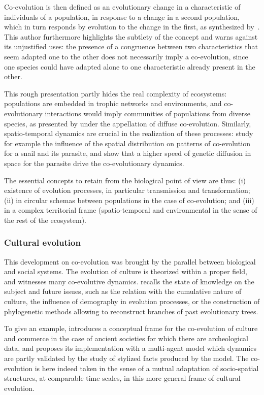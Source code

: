 \documentclass[letterpaper]{article}
\begin{document}
Co-evolution is then defined as an evolutionary change in a characteristic of individuals of a population, in response to a change in a second population, which in turn responds by evolution to the change in the first, as synthesized by~\cite{janzen1980coevolution}. This author furthermore highlights the subtlety of the concept and warns against its unjustified uses: the presence of a congruence between two characteristics that seem adapted one to the other does not necessarily imply a co-evolution, since one species could have adapted alone to one characteristic already present in the other.

This rough presentation partly hides the real complexity of ecosystems: populations are embedded in trophic networks and environments, and co-evolutionary interactions would imply communities of populations from diverse species, as presented by \cite{strauss2005toward} under the appellation of diffuse co-evolution. Similarly, spatio-temporal dynamics are crucial in the realization of these processes: \cite{dybdahl1996geography} study for example the influence of the spatial distribution on patterns of co-evolution for a snail and its parasite, and show that a higher speed of genetic diffusion in space for the parasite drive the co-evolutionary dynamics.


The essential concepts to retain from the biological point of view are thus: (i) existence of evolution processes, in particular transmission and transformation; (ii) in circular schemas between populations in the case of co-evolution; and (iii) in a complex territorial frame (spatio-temporal and environmental in the sense of the rest of the ecosystem).



\subsubsection{Cultural evolution}

This development on co-evolution was brought by the parallel between biological and social systems. The evolution of culture is theorized within a proper field, and witnesses many co-evolutive dynamics. \cite{Mesoudi25072017} recalls the state of knowledge on the subject and future issues, such as the relation with the cumulative nature of culture, the influence of demography in evolution processes, or the construction of phylogenetic methods allowing to reconstruct branches of past evolutionary trees.

To give an example, \cite{carrignon2015modelling} introduces a conceptual frame for the co-evolution of culture and commerce in the case of ancient societies for which there are archeological data, and proposes its implementation with a multi-agent model which dynamics are partly validated by the study of stylized facts produced by the model. The co-evolution is here indeed taken in the sense of a mutual adaptation of socio-spatial structures, at comparable time scales, in this more general frame of cultural evolution.
\end{document}

